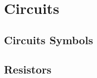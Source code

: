 \chapter{Circuits} \label{chap:Circuits}
	\section{Circuits Symbols} 
	\section{Resistors}

		
	
	
	

	


